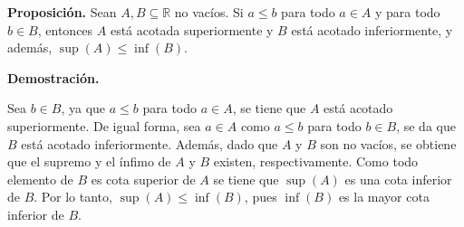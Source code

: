 \documentclass[fleqn,12pt]{article}
\begin{document}
	\textbf{Proposición.} Sean $ A, B \subseteq \mathbb{R} $ no vacíos. Si $ a \leq b $ para todo $ a \in A $ y para todo $ b \in B $, entonces $ A $ está acotada superiormente y $ B $ está acotado inferiormente, y además, $ \sup (A) \leq \inf (B) $.

	\textbf{Demostración.} 

	Sea $ b \in B $, ya que $ a \leq b $ para todo $ a \in A $, se tiene que $ A $ está acotado superiormente. De igual forma, sea $ a \in A $ como $ a \leq b $ para todo $ b \in B $, se da que $ B $ está acotado inferiormente. Además, dado que $ A $ y $ B $ son no vacíos, se obtiene que el supremo y el ínfimo de $ A $ y $ B $ existen, respectivamente. Como todo elemento de $ B $ es cota superior de $ A $ se tiene que $ \sup (A) $ es una cota inferior de $ B $. Por lo tanto, $ \sup (A) \leq \inf (B) $, pues $ \inf(B) $ es la mayor cota inferior de $ B $.
\end{document}
